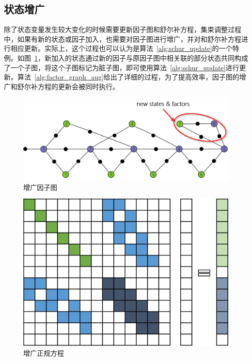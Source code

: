 \subsection{状态增广}

除了状态变量发生较大变化的时候需要更新因子图和舒尔补方程，集束调整过程中，如果有新的状态或因子加入，也需要对因子图进行增广，并对和舒尔补方程进行相应更新。实际上，这个过程也可以认为是算法~\ref{alg:schur_update}的一个特例。如图~\ref{fig:factor_graph_aug}，新加入的状态通过新的因子与原因子图中相关联的部分状态共同构成了一个子图，将这个子图标记为脏子图，即可使用算法~\ref{alg:schur_update}进行更新。算法~\ref{alg:factor_graph_aug}给出了详细的过程，为了提高效率，因子图的增广和舒尔补方程的更新会被同时执行。

\begin{figure}[htb!]
    \centering
    \includegraphics[scale=.7]{Pictures/factor_graph_aug.png}
    \caption{增广因子图}
    \label{fig:factor_graph_aug}
\end{figure}

\begin{figure}[htb!]
    \centering
    \includegraphics[scale=1]{Pictures/normal_eq_aug.png}
    \caption{增广正规方程}
    \label{fig:normal_eq_aug}
\end{figure}

